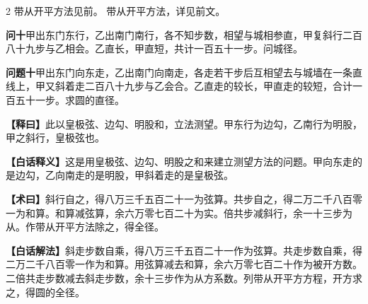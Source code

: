 \documentclass[11pt,a4paper]{article}
\newcommand{\WenQuestion}[1]{\textbf{\textcolor{classicalcolor}{#1}}}
\newcommand{\BaiQuestion}[1]{\textbf{\textcolor{moderncolor}{#1}}}
\newcommand{\WenExplain}{\textcolor{classicalcolor}{\textbf{【释曰】}}}
\newcommand{\BaiExplain}{\textcolor{moderncolor}{\textbf{【白话释义】}}}
\newcommand{\WenMethod}{\textcolor{classicalcolor}{\textbf{【术曰】}}}
\newcommand{\BaiMethod}{\textcolor{moderncolor}{\textbf{【白话解法】}}}
\begin{document}
\begin{paracol}{2}
\switchcolumn*
\small 带从开平方法见前。
\switchcolumn
\small 带从开平方法，详见前文。

\vspace{0.8em}

\switchcolumn*
\begin{tcolorbox}[colback=red!3,colframe=red!30!black,boxrule=0.3pt]
\WenQuestion{问十}\quad 甲出东门东行，乙出南门南行，各不知步数，相望与城相参直，甲复斜行二百八十九步与乙相会。乙直长，甲直短，共计一百五十一步。问城径。
\end{tcolorbox}
\switchcolumn
\begin{tcolorbox}[colback=blue!3,colframe=blue!30!black,boxrule=0.3pt]
\BaiQuestion{问题十}\quad 甲出东门向东走，乙出南门向南走，各走若干步后互相望去与城墙在一条直线上，甲又斜着走二百八十九步与乙会合。乙直走的较长，甲直走的较短，合计一百五十一步。求圆的直径。
\end{tcolorbox}

\switchcolumn*
\begin{tcolorbox}[colback=red!5,colframe=red!30!black,boxrule=0.3pt]
\WenExplain\quad 此以皇极弦、边勾、明股和，立法测望。甲东行为边勾，乙南行为明股，甲之斜行，皇极弦也。
\end{tcolorbox}
\switchcolumn
\begin{tcolorbox}[colback=blue!5,colframe=blue!30!black,boxrule=0.3pt]
\BaiExplain\quad 这是用皇极弦、边勾、明股之和来建立测望方法的问题。甲向东走的是边勾，乙向南走的是明股，甲斜着走的是皇极弦。
\end{tcolorbox}

\switchcolumn*
\begin{tcolorbox}[colback=red!5,colframe=red!40!black,boxrule=0.3pt]
\WenMethod\quad 斜行自之，得八万三千五百二十一为弦算。共步自之，得二万二千八百零一为和算。和算减弦算，余六万零七百二十为实。倍共步减斜行，余一十三步为从。作带从开平方法除之，得全径。
\end{tcolorbox}
\switchcolumn
\begin{tcolorbox}[colback=blue!5,colframe=blue!40!black,boxrule=0.3pt]
\BaiMethod\quad 斜走步数自乘，得八万三千五百二十一作为弦算。共走步数自乘，得二万二千八百零一作为和算。用弦算减去和算，余六万零七百二十作为被开方数。二倍共走步数减去斜走步数，余十三步作为从方系数。列带从开平方方程，开方求之，得圆的全径。
\end{tcolorbox}

\end{paracol}
\end{document}
